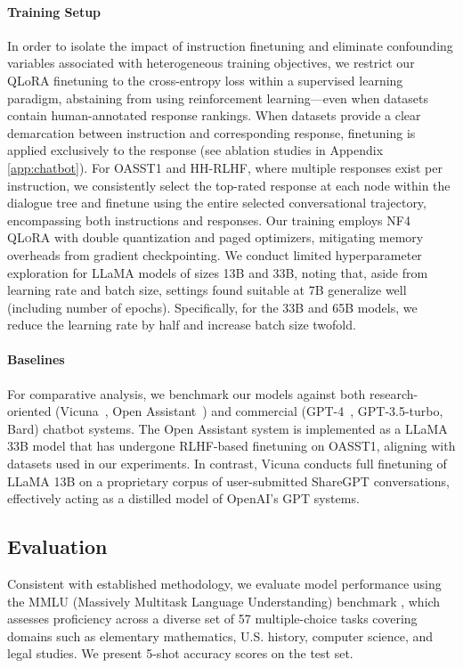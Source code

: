 \paragraph{Training Setup} In order to isolate the impact of instruction finetuning and eliminate confounding variables associated with heterogeneous training objectives, we restrict our QLoRA finetuning to the cross-entropy loss within a supervised learning paradigm, abstaining from using reinforcement learning—even when datasets contain human-annotated response rankings. When datasets provide a clear demarcation between instruction and corresponding response, finetuning is applied exclusively to the response (see ablation studies in Appendix \ref{app:chatbot}). For OASST1 and HH-RLHF, where multiple responses exist per instruction, we consistently select the top-rated response at each node within the dialogue tree and finetune using the entire selected conversational trajectory, encompassing both instructions and responses. Our training employs NF4 \textsc{QLoRA} with double quantization and paged optimizers, mitigating memory overheads from gradient checkpointing. We conduct limited hyperparameter exploration for LLaMA models of sizes 13B and 33B, noting that, aside from learning rate and batch size, settings found suitable at 7B generalize well (including number of epochs). Specifically, for the 33B and 65B models, we reduce the learning rate by half and increase batch size twofold.

\paragraph{Baselines} For comparative analysis, we benchmark our models against both research-oriented (Vicuna~\citep{vicuna2023}, Open Assistant~\citep{kopf2023openassistant}) and commercial (GPT-4~\citep{openai2023gpt}, GPT-3.5-turbo, Bard) chatbot systems. The Open Assistant system is implemented as a LLaMA 33B model that has undergone RLHF-based finetuning on OASST1, aligning with datasets used in our experiments. In contrast, Vicuna conducts full finetuning of LLaMA 13B on a proprietary corpus of user-submitted ShareGPT conversations, effectively acting as a distilled model of OpenAI’s GPT systems.

\subsection{Evaluation}

Consistent with established methodology, we evaluate model performance using the MMLU (Massively Multitask Language Understanding) benchmark \citep{hendrycksmeasuring}, which assesses proficiency across a diverse set of 57 multiple-choice tasks covering domains such as elementary mathematics, U.S. history, computer science, and legal studies. We present 5-shot accuracy scores on the test set.

